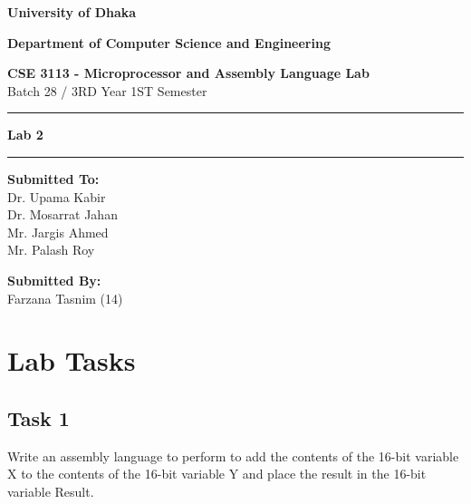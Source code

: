 \documentclass[a4paper,12pt]{article}
\begin{document}
\begin{titlepage}
    \begin{center}
        
        \Huge
        \textbf{University of Dhaka}
        
        \vspace{1cm}
        \LARGE
        \textbf{Department of Computer Science and Engineering}
        
        \vspace{1cm}
       
        \textbf{CSE 3113 - Microprocessor and Assembly Language Lab} \\
        Batch 28 / 3RD Year 1ST Semester\\
        \vspace{1cm}

        \noindent\rule{\linewidth}{0.5mm} %

\begin{center}
    \LARGE\textbf{Lab 2}
\end{center}

\noindent\rule{\linewidth}{0.5mm} %

        
        \vspace{1.5cm}
        \textbf{Submitted To: \\ }Dr. Upama Kabir \\
        Dr. Mosarrat Jahan \\
        Mr. Jargis Ahmed \\
        Mr. Palash Roy \\
        \vspace{1cm}
        
        \vspace{1cm}
        \textbf{Submitted By:} \\ Farzana Tasnim (14) \\ 
        
        \vfill
        
        \Large
        \vspace{2cm}
        
    \end{center}
\end{titlepage}

\section{Lab Tasks}
\subsection{Task 1}
Write an assembly language to perform to add the contents of the
16-bit variable X to the contents of the 16-bit variable Y and place the
result in the 16-bit variable Result.
\end{document}

